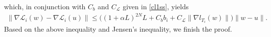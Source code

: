 \documentclass{osudissert96}
\begin{document}
	\hspace{-0.23cm}which, in conjunction with $C_b$ and $C_\mathcal{L}$ given in \cref{cl1ss}, yields 
	\begin{align*}
	\|\nabla \mathcal{L}_i(w)  -\nabla \mathcal{L}_i(u) \| \leq \big((1+\alpha L)^{2N}L + C_bb_i + C_{\mathcal{L}} \|\nabla l_{T_i}(w)\|  \big)\|w-u\|.
	\end{align*}
	Based on the above inequality and  Jensen's inequality, we 
	finish the proof.

\end{document}
